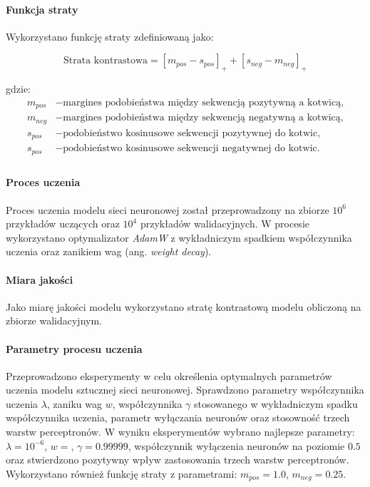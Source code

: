 \documentclass{article}
\begin{document}
{            \paragraph{Funkcja straty}
                Wykorzystano funkcję straty zdefiniowaną jako:

                \begin{equation}
                    \text{Strata kontrastowa} = [m_{pos} - s_{pos}]_{+} + [s_{neg} - m_{neg}]_{+}
                \end{equation}

                gdzie:
                \begin{align*}
                    m_{pos} &- \text{margines podobieństwa między sekwencją pozytywną a kotwicą,} \\
                    m_{neg} &- \text{margines podobieństwa między sekwencją negatywną a kotwicą,} \\
                    s_{pos} &- \text{podobieństwo kosinusowe sekwencji pozytywnej do kotwic,} \\
                    s_{pos} &- \text{podobieństwo kosinusowe sekwencji negatywnej do kotwic.} \\
                \end{align*}

            \paragraph{Proces uczenia}
                Proces uczenia modelu sieci neuronowej został przeprowadzony na zbiorze $10^{6}$ przykładów uczących oraz $10^{4}$ przykładów walidacyjnych.
                W procesie wykorzystano optymalizator \textit{AdamW}\cite{Loshchilov2017DecoupledWD} z wykładniczym spadkiem współczynnika uczenia oraz zanikiem wag (ang. \textit{weight decay}).

            \paragraph{Miara jakości}
                Jako miarę jakości modelu wykorzystano stratę kontrastową modelu obliczoną na zbiorze walidacyjnym.

            \paragraph{Parametry procesu uczenia}
                Przeprowadzono eksperymenty w celu określenia optymalnych parametrów uczenia modelu sztucznej sieci neuronowej. Sprawdzono parametry współczynnika uczenia $\lambda$, zaniku wag $w$, współczynnika $\gamma$ stosowanego w wykładniczym spadku współczynnika uczenia, parametr wyłączania neuronów oraz stosowność trzech warstw perceptronów. W wyniku eksperymentów wybrano najlepsze parametry: $\lambda = 10^{-6}$, $w = $, $\gamma=0.99999$, współczynnik wyłączenia neuronów na poziomie $0.5$ oraz stwierdzono pozytywny wpływ zastosowania trzech warstw perceptronów.
                Wykorzystano również funkcję straty z parametrami: $m_{pos} = 1.0$, $m_{neg} = 0.25$.

}
\end{document}
